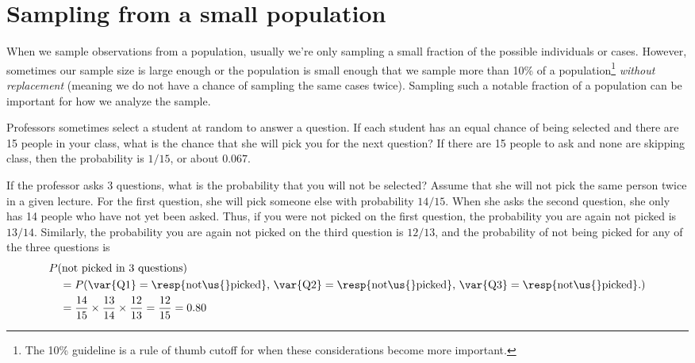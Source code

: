 \section{Sampling from a small population}
\label{smallPop}

\noindent%
When we sample observations from a population,
usually we're only sampling a small fraction of
the possible individuals or cases.
However, sometimes our sample size is large enough
or the population is small enough that we
sample more than 10\% of a population\footnote{The 10\%
  guideline is a rule of thumb cutoff for when these
  considerations become more important.}
\emph{without
replacement} (meaning we do not have a chance of
sampling the same cases twice).
Sampling such a notable fraction of a population
can be important for how we analyze the
sample.

\begin{examplewrap}
\begin{nexample}{Professors sometimes select a student at random to answer a question. If each student has an equal chance of being selected and there are 15 people in your class, what is the chance that she will pick you for the next question?}
If there are 15 people to ask and none are skipping class, then the probability is $1/15$, or about $0.067$.
\end{nexample}
\end{examplewrap}

\begin{examplewrap}
\begin{nexample}{If the professor asks 3 questions, what is the probability that you will not be selected? Assume that she will not pick the same person twice in a given lecture.}\label{3woRep}
For the first question, she will pick someone else with probability $14/15$. When she asks the second question, she only has 14 people who have not yet been asked. Thus, if you were not picked on the first question, the probability you are again not picked is $13/14$. Similarly, the probability you are again not picked on the third question is $12/13$, and the probability of not being picked for any of the three questions is
\begin{align*}
&P(\text{not picked in 3 questions}) \\
&\quad = P(\text{\var{Q1}} = \text{\resp{not\us{}picked}, }\text{\var{Q2}} = \text{\resp{not\us{}picked}, }\text{\var{Q3}} = \text{\resp{not\us{}picked}.}) \\
&\quad = \frac{14}{15}\times\frac{13}{14}\times\frac{12}{13} = \frac{12}{15} = 0.80
\end{align*}
\end{nexample}
\end{examplewrap}

